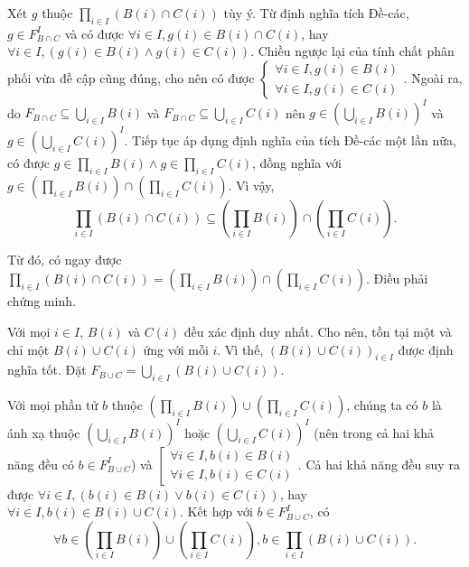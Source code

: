 Xét $g$ thuộc $\prod_{i \in I}(B(i) \cap C(i))$ tùy ý. Từ định nghĩa tích Đề-các, $g \in F_{B \cap C}^I$ và có được $\forall i \in I, g(i) \in B(i) \cap C(i)$, hay $\forall i \in I, \left(g(i) \in B(i) \land g(i) \in C(i)\right)$. Chiều ngược lại của tính chất phân phối vừa đề cập cũng đúng, cho nên có được $\begin{cases}
   \forall i \in I, g(i) \in B(i) \\
   \forall i \in I, g(i) \in C(i)
\end{cases}$. Ngoài ra, do $F_{B \cap C} \subseteq \bigcup_{i \in I}B(i)$ và $F_{B \cap C} \subseteq \bigcup_{i \in I}C(i)$ nên $g \in \left(\bigcup_{i \in I}B(i)\right)^I$ và $g \in \left(\bigcup_{i \in I}C(i)\right)^I$. Tiếp tục áp dụng định nghĩa của tích Đề-các một lần nữa, có được $g \in \prod_{i \in I}B(i) \land g \in \prod_{i \in I}C(i)$, đồng nghĩa với $g \in \left(\prod_{i \in I}B(i)\right) \cap \left(\prod_{i \in I}C(i)\right)$. Vì vậy, 
\begin{equation*}
   \prod_{i \in I}(B(i) \cap C(i)) \subseteq \left(\prod_{i \in I}B(i)\right) \cap \left(\prod_{i \in I}C(i)\right).
\end{equation*}

Từ đó, có ngay được $\prod_{i \in I}(B(i) \cap C(i)) = \left(\prod_{i \in I}B(i)\right) \cap \left(\prod_{i \in I}C(i)\right)$. Điều phải chứng minh.

\stepSubexercise Với mọi $i \in I$, $B(i)$ và $C(i)$ đều xác định duy nhất. Cho nên, tồn tại một và chỉ một $B(i) \cup C(i)$ ứng với mỗi $i$. Vì thế, $\left(B(i) \cup C(i)\right)_{i \in I}$ được định nghĩa tốt. Đặt $F_{B \cup C} = \bigcup_{i \in I}(B(i) \cup C(i))$.

Với mọi phần tử $b$ thuộc $\left(\prod_{i \in I}B(i)\right) \cup \left(\prod_{i \in I}C(i)\right)$, chúng ta có $b$ là ánh xạ thuộc $\left(\bigcup_{i \in I}B(i)\right)^I$ hoặc $\left(\bigcup_{i \in I}C(i)\right)^I$ (nên trong cả hai khả năng đều có $b \in F_{B \cup C}^I$) và $
   \left[\begin{aligned}
      \forall i \in I, b(i) \in B(i) \\
      \forall i \in I, b(i) \in C(i)
   \end{aligned}\right.
$. Cả hai khả năng đều suy ra được $\forall i \in I, \left(b(i) \in B(i) \lor b(i) \in C(i)\right)$, hay $\forall i \in I, b(i) \in B(i) \cup C(i)$. Kết hợp với $b \in F_{B \cup C}^I$, có \begin{equation*}
   \forall b \in \left(\prod_{i \in I}B(i)\right) \cup \left(\prod_{i \in I}C(i)\right), b \in \prod_{i \in I}\left(B(i) \cup C(i)\right).
\end{equation*} 

